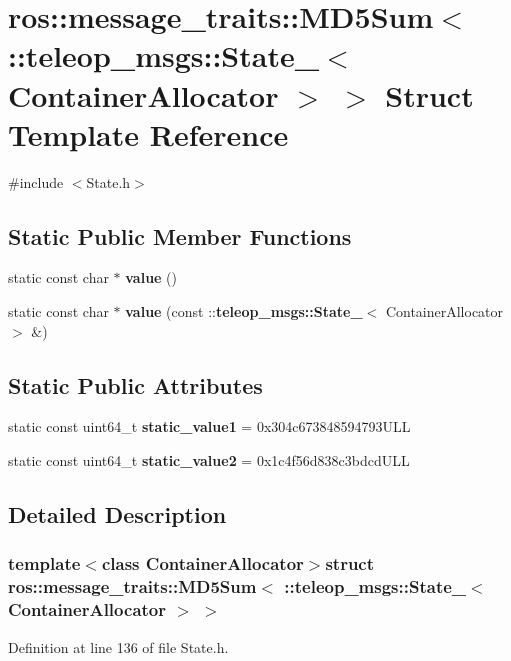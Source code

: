 \section{ros::message\_\-traits::MD5Sum$<$ ::teleop\_\-msgs::State\_\-$<$ ContainerAllocator $>$ $>$ Struct Template Reference}
\label{structros_1_1message__traits_1_1MD5Sum_3_01_1_1teleop__msgs_1_1State___3_01ContainerAllocator_01_4_01_4}


{\ttfamily \#include $<$State.h$>$}

\subsection*{Static Public Member Functions}
\begin{DoxyCompactItemize}
\item 
static const char $\ast$ {\bf value} ()
\item 
static const char $\ast$ {\bf value} (const ::{\bf teleop\_\-msgs::State\_\-}$<$ ContainerAllocator $>$ \&)
\end{DoxyCompactItemize}
\subsection*{Static Public Attributes}
\begin{DoxyCompactItemize}
\item 
static const uint64\_\-t {\bf static\_\-value1} = 0x304c673848594793ULL
\item 
static const uint64\_\-t {\bf static\_\-value2} = 0x1c4f56d838c3bdcdULL
\end{DoxyCompactItemize}


\subsection{Detailed Description}
\subsubsection*{template$<$class ContainerAllocator$>$struct ros::message\_\-traits::MD5Sum$<$ ::teleop\_\-msgs::State\_\-$<$ ContainerAllocator $>$ $>$}



Definition at line 136 of file State.h.



